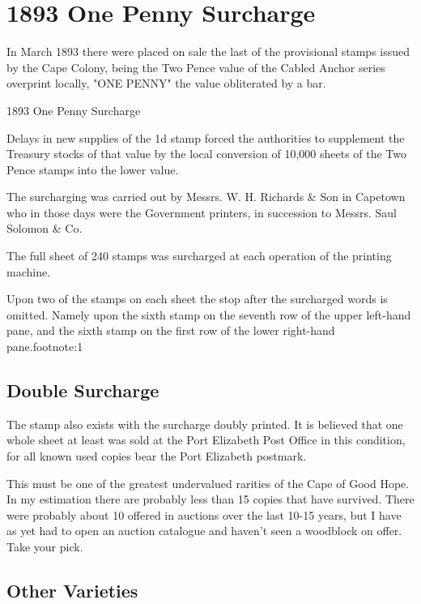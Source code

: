 \chapter{1893 One Penny Surcharge}
In March 1893 there were placed on sale the last of the provisional stamps 
issued by the Cape Colony, being the Two Pence value of the Cabled Anchor 
series overprint locally, "ONE PENNY"  the value obliterated by a bar. 

{1893 One Penny Surcharge}


Delays in new supplies of the 1d stamp forced the authorities to supplement 
the Treasury stocks of that value by the 
local conversion of 10,000 sheets of the Two Pence stamps into 
the lower value.


The surcharging was carried out by Messrs.  W. H. Richards \& Son in 
Capetown who in those days were the Government printers, 
in succession to Messrs. Saul Solomon \& Co.

The full sheet of 240 stamps was surcharged at each operation 
of the printing machine.

Upon  two  of the stamps on each sheet the stop after the 
surcharged words is omitted. Namely upon the sixth stamp on the seventh row of the upper left-hand pane, and the sixth stamp on the first row of the lower right-hand pane.{{footnote:1}}

 

\section{Double Surcharge}



The stamp also exists with the surcharge doubly printed. It is believed that one whole sheet at 
least was sold at the Port Elizabeth Post Office in this condition, for all known used copies bear 
the Port Elizabeth postmark.

This must be one of the greatest undervalued rarities of the 
Cape of Good Hope. In my estimation there are probably less 
than 15 copies that have survived. There were probably about 10 
offered in auctions over the last 10-15 years, but I have as 
yet had to open an auction catalogue and haven't seen a woodblock on offer. 
Take your pick.

\section{Other Varieties}

